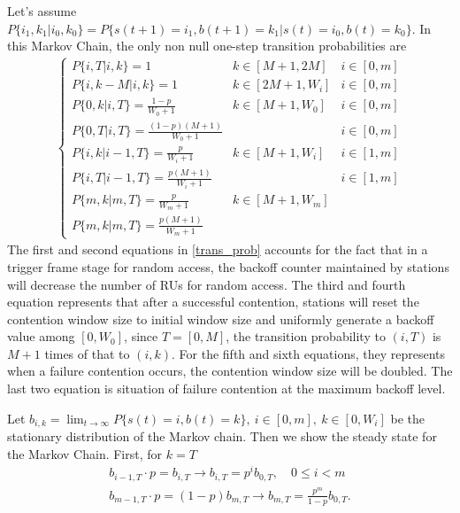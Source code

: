 Let's assume $P\lbrace i_1, k_1|i_0,k_0\rbrace = P\lbrace s(t+1) = i_1, b(t+1)= k_1|s(t) = i_0, b(t) = k_0\rbrace $. In this Markov Chain, the only non null one-step transition probabilities are 
\begin{align}
\left\lbrace
\begin{array}{lll}
P\lbrace i, T | i, k \rbrace = 1  						& k\in [M+1,2M]			& i \in [0,m]\\ [3pt]
P\lbrace i, k-M | i, k \rbrace = 1  						& k\in [2M+1,W_i]   		& i \in [0,m]\\ [3pt]
P\lbrace 0, k | i, T \rbrace = \frac{1-p}{W_0+1}  		& k\in [M+1,W_0]			& i \in [0,m]\\ [3pt]
P\lbrace 0, T | i, T \rbrace = \frac{(1-p)(M+1)}{W_0+1}  &						& i \in [0,m]\\ [3pt]
P\lbrace i, k | i-1, T \rbrace = \frac{p}{W_i+1} 		& k\in [M+1,W_i] 		& i \in [1,m]\\ [3pt]
P\lbrace i, T | i-1, T \rbrace = \frac{p(M+1)}{W_i+1}    &  						& i \in [1,m]\\ [3pt]
P\lbrace m, k | m, T \rbrace = \frac{p}{W_m+1} 		 	& k\in [M+1,W_m] 		& \\ [3pt]
P\lbrace m, k | m, T \rbrace = \frac{p(M+1)}{W_m+1}
\end{array}
\right.
\label{trans_prob}
\end{align}
The first and second equations in \ref{trans_prob} accounts for the fact that in a trigger frame stage for random access, the backoff counter maintained by stations will decrease the number of RUs for random access. 
The third and fourth equation represents that after a successful contention, stations will reset the contention window size to initial window size and uniformly generate a backoff value among $[0,W_0]$, since $T = [0,M]$, the transition probability to $( i, T )$ is $M+1$ times of that to $( i, k )$. 
For the fifth and sixth equations, they represents when a failure contention occurs, the contention window size will be doubled. 
The last two equation is situation of failure contention at the maximum backoff level.

Let $b_{i,k} = \lim_{t\rightarrow \infty} P\lbrace s(t) = i, b(t) = k\rbrace,\ i\in [0,m], \ k \in [0,W_i]$ be the stationary distribution of the Markov chain. Then we show the steady state for the Markov Chain.
First,  for $k = T$
\begin{align}
b_{i-1,T}\cdot p = b_{i,T} 		\rightarrow b_{i,T} = p^i b_{0,T}, \quad 0\leq i < m\\
b_{m-1,T}\cdot p = (1-p) b_{m,T}	\rightarrow b_{m,T} = \frac{p^m}{1-p}b_{0,T}.
\label{biT}
\end{align}

